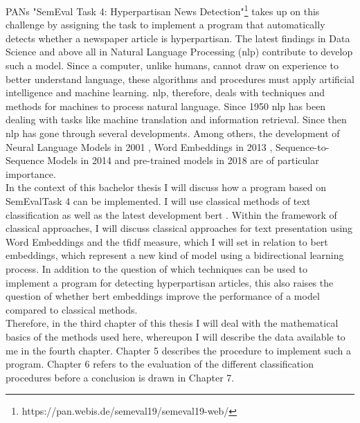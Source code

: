 \documentclass[a4paper, 11pt,titlepage,oneside,openany]{book}
\begin{document}
\indent PANs "SemEval Task 4: Hyperpartisan News Detection"\footnote{https://pan.webis.de/semeval19/semeval19-web/} \cite{hyperpartisannewsdetection} takes up on this challenge by assigning the task to implement a program that automatically detects whether a newspaper article is hyperpartisan. The latest findings in Data Science and above all in Natural Language Processing (\gls{nlp}) contribute to develop such a model. Since a computer, unlike humans, cannot draw on experience to better understand language, these algorithms and procedures must apply artificial intelligence and machine learning. \gls{nlp}, therefore, deals with techniques and methods for machines to process natural language. Since 1950 \gls{nlp} has been dealing with tasks like machine translation and information retrieval. Since then \gls{nlp} has gone through several developments. Among others, the development of Neural Language Models in 2001 \cite{neural}, Word Embeddings in 2013 \cite{wb1}, Sequence-to-Sequence Models in 2014 \cite{s2s} and pre-trained models in 2018 \cite{pre1}\cite{pre2}\cite{pre3} are of particular importance. \\
\indent In the context of this bachelor thesis I will discuss how a program based on SemEvalTask 4 can be implemented. I will use classical methods of text classification as well as the latest development \gls{bert} \cite{bert}. Within the framework of classical approaches, I will discuss classical approaches for text presentation using Word Embeddings \cite{neural} and the \gls{tfidf}  \cite{infor} measure, which I will set in relation to \gls{bert} embeddings, which represent a new kind of model using a bidirectional learning process. In addition to the question of which techniques can be used to implement a program for detecting hyperpartisan articles, this also raises the question of whether \gls{bert} embeddings improve the performance of a model compared to classical methods. \\
\indent Therefore, in the third chapter of this thesis I will deal with the mathematical basics of the methods used here, whereupon I will describe the data available to me in the fourth chapter. Chapter 5 describes the procedure to implement such a program. Chapter 6 refers to the evaluation of the different classification procedures before a conclusion is drawn in Chapter 7. 
\end{document}
